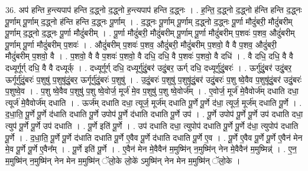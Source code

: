 \documentclass[17pt]{extarticle}
\begin{document}
36. अप॑ हन्ति ह॒न्त्यपाप॑ हन्ति द॒द्ध्नो द॒द्ध्नो ह॒न्त्यपाप॑ हन्ति द॒द्ध्नः । . ह॒न्ति॒ द॒द्ध्नो द॒द्ध्नो ह॑न्ति हन्ति द॒द्ध्नः पू॒र्णाम् पू॒र्णाम् द॒द्ध्नो ह॑न्ति हन्ति द॒द्ध्नः पू॒र्णाम् । . द॒द्ध्नः पू॒र्णाम् पू॒र्णाम् द॒द्ध्नो द॒द्ध्नः पू॒र्णा मौदुं॑बरी॒ मौदुं॑बरीम् पू॒र्णाम् द॒द्ध्नो द॒द्ध्नः पू॒र्णा मौदुं॑बरीम् । . पू॒र्णा मौदुं॑बरी॒ मौदुं॑बरीम् पू॒र्णाम् पू॒र्णा मौदुं॑बरीम् प॒शवः॑ प॒शव॒ औदुं॑बरीम् पू॒र्णाम् पू॒र्णा मौदुं॑बरीम् प॒शवः॑ । . औदुं॑बरीम् प॒शवः॑ प॒शव॒ औदुं॑बरी॒ मौदुं॑बरीम् प॒शवो॒ वै वै प॒शव॒ औदुं॑बरी॒ मौदुं॑बरीम् प॒शवो॒ वै । . प॒शवो॒ वै वै प॒शवः॑ प॒शवो॒ वै दधि॒ दधि॒ वै प॒शवः॑ प॒शवो॒ वै दधि॑ । . वै दधि॒ दधि॒ वै वै दध्यूर्गूर्ग् दधि॒ वै वै दध्यूर्क् । . दध्यूर्गूर्ग् दधि॒ दध्यूर्गु॑दुं॒बर॑ उदुं॒बर॒ ऊर्ग् दधि॒ दध्यूर्गु॑दुं॒बरः॑ । . ऊर्गु॑दुं॒बर॑ उदुं॒बर॒ ऊर्गूर्गु॑दुं॒बरः॑ प॒शुषु॑ प॒शुषू॑दुं॒बर॒ ऊर्गूर्गु॑दुं॒बरः॑ प॒शुषु॑ । . उ॒दुं॒बरः॑ प॒शुषु॑ प॒शुषू॑दुं॒बर॑ उदुं॒बरः॑ प॒शु ष्वे॒वैव प॒शुषू॑दुं॒बर॑ उदुं॒बरः॑ प॒शुष्वे॒व । . प॒शु ष्वे॒वैव प॒शुषु॑ प॒शु ष्वे॒वोर्ज॒ मूर्ज॑ मे॒व प॒शुषु॑ प॒शु ष्वे॒वोर्ज᳚म् । . ए॒वोर्ज॒ मूर्ज॑ मे॒वैवोर्ज॑म् दधाति दधा॒ त्यूर्ज॑ मे॒वैवोर्ज॑म् दधाति । . ऊर्ज॑म् दधाति दधा॒ त्यूर्ज॒ मूर्ज॑म् दधाति पू॒र्णे पू॒र्णे द॑धा॒ त्यूर्ज॒ मूर्ज॑म् दधाति पू॒र्णे । . द॒धा॒ति॒ पू॒र्णे पू॒र्णे द॑धाति दधाति पू॒र्णे उपोप॑ पू॒र्णे द॑धाति दधाति पू॒र्णे उप॑ । . पू॒र्णे उपोप॑ पू॒र्णे पू॒र्णे उप॑ दधाति दधा॒ त्युप॑ पू॒र्णे पू॒र्णे उप॑ दधाति । . पू॒र्णे इति॑ पू॒र्णे । . उप॑ दधाति दधा॒ त्युपोप॑ दधाति पू॒र्णे पू॒र्णे द॑धा॒ त्युपोप॑ दधाति पू॒र्णे । . द॒धा॒ति॒ पू॒र्णे पू॒र्णे द॑धाति दधाति पू॒र्णे ए॒वैव पू॒र्णे द॑धाति दधाति पू॒र्णे ए॒व । . पू॒र्णे ए॒वैव पू॒र्णे पू॒र्णे ए॒वैन॑ मेन मे॒व पू॒र्णे पू॒र्णे ए॒वैन᳚म् । . पू॒र्णे इति॑ पू॒र्णे । . ए॒वैन॑ मेन मे॒वैवैन॑ म॒मुष्मि॑न् न॒मुष्मि॑न् नेन मे॒वैवैन॑ म॒मुष्मिन्न्॑ । . ए॒न॒ म॒मुष्मि॑न् न॒मुष्मि॑न् नेन मेन म॒मुष्मि॑न् ॅलो॒के लो॒के॑ ऽमुष्मि॑न् नेन मेन म॒मुष्मि॑न् ॅलो॒के । \newline
\pagebreak
{}
\end{document}
